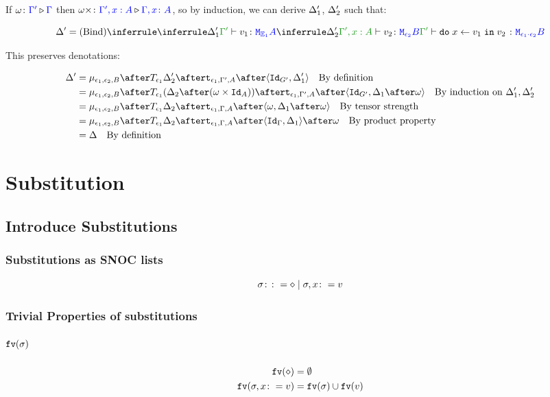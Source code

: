 \documentclass{report}
\begin{document}
If $\omega \colon {\color{blue}\Gamma'} \triangleright {\color {blue} \Gamma}$ then $\omega\times \colon {\color{blue}\Gamma',x:A} \triangleright {\color {blue} \Gamma, x\colon A}$, so by induction, we can derive $\Delta_1'$, $\Delta_2'$ such that:

\begin{equation}
    \D' = \ntreeruleII{Bind}{
        \treeruleI{\D_1'}{\typerelation{\G'}{v_1}{\M{\E_1}{A}}}
        }{
        \treeruleI{\D_2'}{\typerelation{\G',x: A}{v_2}{\M{\e_2}{B}}}
    }{
        \typerelation{\G'}{\doin{x}{v_1}{v_2}}{\M{\e_1\dot\e_2}{B}}
    }
\end{equation}

This preserves denotations:

\begin{align*}
    \D' & = \bind{\e_1}{\e_2}{B}\after\T{\e_1}{\D_2'}\after\tstrength{\e_1}{\G'}{A}\after\pr{\Id{G'}}{\D_1'}\qt{By definition}\\
    & = \bind{\e_1}{\e_2}{B}\after\T{\e_1}{(\D_2\after(\w\times\Id{A}))}\after\tstrength{\e_1}{\G'}{A}\after\pr{\Id{G'}}{\D_1\after\w}\qt{By induction on $\D_1', \D_2'$}\\
    & = \bind{\e_1}{\e_2}{B}\after\T{\e_1}{\D_2}\after\tstrength{\e_1}{\G}{A}\after\pr{\w}{\D_1\after\w}\qt{By tensor strength}\\
    & = \bind{\e_1}{\e_2}{B}\after\T{\e_1}{\D_2}\after\tstrength{\e_1}{\G}{A}\after\pr{\idg}{\D_1}\after\w\qt{By product property}\\
    & = \D \qt{By definition}
\end{align*}

\chapter{Substitution}
\section{Introduce Substitutions}
\subsection{Substitutions as SNOC lists}

\begin{equation}
   \sigma \colon\colon= \diamond \mid \sigma, x \colon= v
\end{equation}

\subsection{Trivial Properties of substitutions}
\paragraph{$\texttt{fv}(\sigma)$}
\begin{align*}
    \texttt{fv}(\diamond) &= \emptyset\\
    \texttt{fv}(\sigma, x\colon= v) &= \texttt{fv}(\sigma)\cup\texttt{fv}(v)
\end{align*}
\end{document}
